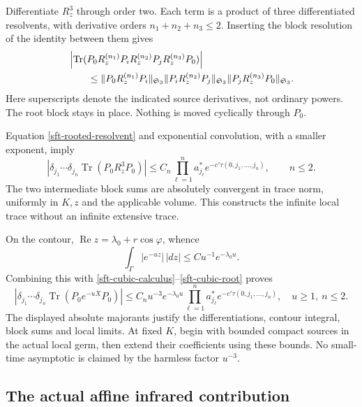 \documentclass[11pt]{article}
\theoremstyle{remark}
\begin{document}
Differentiate \(R_z^3\) through order two. Each term is a product of
three differentiated resolvents, with derivative orders
\(n_1+n_2+n_3\le2\). Inserting the block resolution of the identity
between them gives
\begin{align}
 &\left|\operatorname{Tr}
  (P_0R_z^{(n_1)}P_iR_z^{(n_2)}P_jR_z^{(n_3)}P_0)\right|
 \notag\\
 &\qquad\le
  \|P_0R_z^{(n_1)}P_i\|_{\mathfrak S_3}
  \|P_iR_z^{(n_2)}P_j\|_{\mathfrak S_3}
  \|P_jR_z^{(n_3)}P_0\|_{\mathfrak S_3}.
 \label{sft-local-holder}
\end{align}
Here superscripts denote the indicated source derivatives, not
ordinary powers. The root block stays in place. Nothing is moved
cyclically through \(P_0\).

Equation \eqref{sft-rooted-resolvent} and exponential convolution,
with a smaller exponent, imply
\begin{equation}
 \left|\delta_{j_1}\cdots\delta_{j_n}
       \operatorname{Tr}(P_0R_z^3P_0)\right|
 \le C_n\prod_{\ell=1}^n a_{j_\ell}^*
        e^{-c'\tau(0,j_1,\ldots,j_n)},\qquad n\le2.
 \label{sft-cubic-root}
\end{equation}
The two intermediate block sums are absolutely convergent in trace
norm, uniformly in \(K,z\) and the applicable volume. This constructs
the infinite local trace without an infinite extensive trace.

On the contour,
\(\operatorname{Re}z=\lambda_0+r\cos\varphi\), whence
\[
 \int_\Gamma |e^{-uz}|\,|dz|
       \le C u^{-1}e^{-\lambda_0u}.
\]
Combining this with
\eqref{sft-cubic-calculus}--\eqref{sft-cubic-root} proves
\begin{equation}
 \left|\delta_{j_1}\cdots\delta_{j_n}
       \operatorname{Tr}(P_0e^{-uX}P_0)\right|
 \le C_nu^{-3}e^{-\lambda_0u}
       \prod_{\ell=1}^n a_{j_\ell}^*
       e^{-c'\tau(0,j_1,\ldots,j_n)},\quad u\ge1,\ n\le2.
 \label{sft-rooted-heat}
\end{equation}
The displayed absolute majorants justify the differentiations,
contour integral, block sums and local limits. At fixed \(K\), begin
with bounded compact sources in the actual local germ, then extend
their coefficients using these bounds. No small-time asymptotic is
claimed by the harmless factor \(u^{-3}\).

\subsection{The actual affine infrared contribution}
\label{sft-affine-section}
\end{document}

